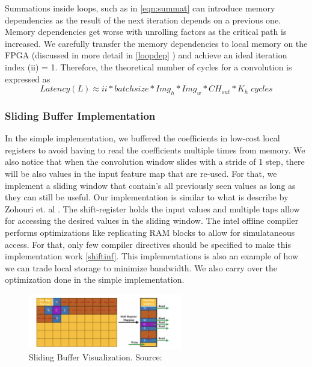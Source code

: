Summations inside loops, such as in \ref{eqn:summat} can introduce memory dependencies as the result of the next iteration depends on a previous one. Memory dependencies get worse with unrolling factors as the critical path is increased. We carefully transfer the memory dependencies to local memory on the FPGA (discussed in more detail in \ref{loopdep} ) and achieve an ideal iteration index (ii) = 1. Therefore, the theoretical number of cycles for a convolution is expressed as 
\begin{equation}
Latency (L)  \approx ii * batch size * Img_h * Img_w * CH_{out} * K_h  \; cycles
\end{equation}




\subsubsection{Sliding Buffer Implementation} \label{slidingimpl}

In the simple implementation, we buffered the coefficients in low-cost local registers to avoid having to read the coefficients multiple times from memory. We also notice that when the convolution window slides with a stride of 1 step, there will be also values in the input feature map that are re-used. For that, we implement a sliding window that contain's all previously seen values as long as they can still be useful. Our implementation is similar to what is describe by Zohouri et. al \cite{2018combined}. The shift-register holds the input values and multiple taps allow for accessing the desired values in the sliding window. The intel offline compiler performs optimizations like replicating RAM blocks to allow for simulataneous access. For that, only few compiler directives should be specified to make this implementation work \ref{shiftinf}. This implementations is also an example of how we can trade local storage to minimize bandwidth. We also carry over the optimization done in the simple implementation.

\begin{figure}[h]
\centering
\includegraphics[width=0.6\textwidth]{Figures/slidingbuffer}
\decoRule
\caption[Sliding Buffer]{ Sliding Buffer Visualization. Source: \cite{2018combined}}
\label{fig:sliding buffer}
\end{figure}

